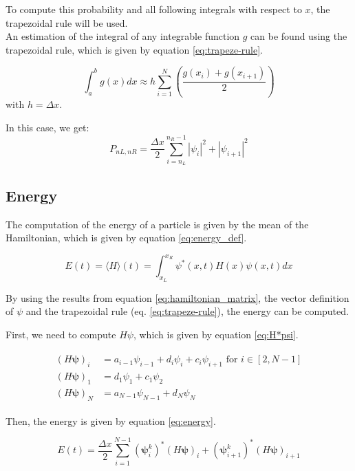 \documentclass[a4paper,12pt,twoside]{article}
\newcommand{\mbf}[1]{\mathbf{#1}} %
\newcommand{\bracket}[1]{\left(#1\right)}
\begin{document}
    To compute this probability and all following integrals with respect to $x$, the trapezoidal rule will be used.\\
    An estimation of the integral of any integrable function $g$ can be found using the trapezoidal rule, which is given by equation \eqref{eq:trapeze-rule}.

    \begin{equation}
      \int_a^b g(x)dx \approx h\sum_{i=1}^N\bracket{\frac{g(x_i) + g(x_{i+1})}{2}}
      \label{eq:trapeze-rule}
    \end{equation}
    with $h = \Delta x$.

    In this case, we get:
    \begin{equation}
     P_{nL,nR}=\frac{\Delta x}{2}\sum_{i=n_L}^{n_R-1} |\psi_i|^2+|\psi_{i+1}|^2
    \end{equation}


  \subsection{Energy}
    The computation of the energy of a particle is given by the mean of the Hamiltonian, which is given by equation \eqref{eq:energy_def}.

    \begin{equation}
      E(t) = \langle H \rangle(t) = \int_{x_L}^{x_R}\psi^*(x,t)H(x)\psi(x,t)dx
      \label{eq:energy_def}
    \end{equation}

    By using the results from equation \eqref{eq:hamiltonian_matrix}, the vector definition of $\psi$ and the trapezoidal rule (eq. \eqref{eq:trapeze-rule}), the energy can be computed.

    First, we need to compute $H\psi$, which is given by equation \eqref{eq:H*psi}.

    \begin{align}
      \begin{split}
        (H\mbf{\psi})_i &= a_{i-1}\psi_{i-1} + d_i\psi_i + c_i\psi_{i+1} \text{ for } i\in[2, N-1]\\
        (H\mbf{\psi})_1 &= d_1\psi_1 + c_1\psi_2 \\
        (H\mbf{\psi})_N &= a_{N-1}\psi_{N-1} + d_N\psi_N
      \end{split}
      \label{eq:H*psi}
    \end{align}

    Then, the energy is given by equation \eqref{eq:energy}.

    \begin{equation}
      E(t) = \frac{\Delta x}{2}\sum_{i=1}^{N-1} (\mbf{\psi}_i^k)^*(H\mbf{\psi})_i + (\mbf{\psi}_{i+1}^k)^*(H\mbf{\psi})_{i+1}
      \label{eq:energy}
    \end{equation}
\end{document}
